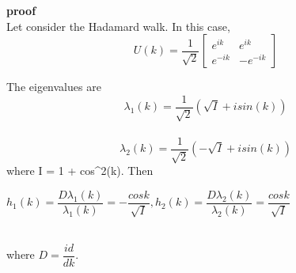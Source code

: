 \textbf{proof}\\
Let consider the Hadamard walk. In this case,
$$ U(k) = \frac{1}{\sqrt{2}}\begin{bmatrix}
    e^{ik} & e^{ik}\\
    e^{-ik} & -e^{-ik}
\end{bmatrix}$$

The eigenvalues are 
$$
\lambda_1(k) = \frac{1}{\sqrt{2}}(\sqrt{I} + isin(k))
$$\\
$$
\lambda_2(k) = \frac{1}{\sqrt{2}}(-\sqrt{I} + isin(k))
$$
where I = 1 + cos^2(k). Then\\
\begin{center}
    $h_1(k) = \dfrac{D\lambda_1(k)}{\lambda_1(k)} = -\dfrac{cos k}{\sqrt{I}}, h_2(k) = \dfrac{D\lambda_2(k)}{\lambda_2(k)} = \dfrac{cos k}{\sqrt{I}}$
\end{center}
 
\\
where $ D = \dfrac{id}{dk}$.
\\